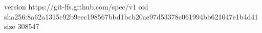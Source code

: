 version https://git-lfs.github.com/spec/v1
oid sha256:8a62a1315c92b9eec198567bbd1bcb20ae97d53378c061994bb621047e1b4d41
size 308547
